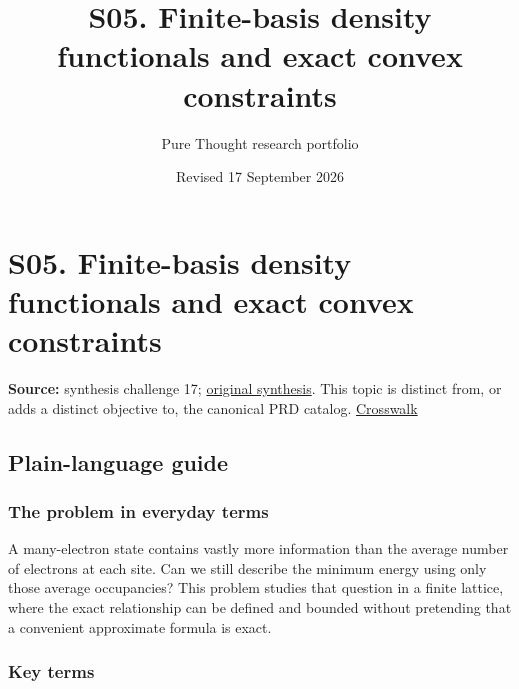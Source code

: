 \documentclass[
  11pt,
]{article}
\title{S05. Finite-basis density functionals and exact convex
constraints}
\author{Pure Thought research portfolio}
\date{Revised 17 September 2026}
\begin{document}
\maketitle
\thispagestyle{empty}
\clearpage

\section{S05. Finite-basis density functionals and exact convex
constraints}

\textbf{Source:} synthesis challenge 17;
\href{https://github.com/rick-stevens-ai/Pure-Thought/blob/main/NOTES/30-Most-Compelling-Pure-Thought-AI-Challenges.md}{original
synthesis}. This topic is distinct from, or adds a distinct objective
to, the canonical PRD catalog.
\href{https://github.com/rick-stevens-ai/Pure-Thought/blob/main/reviews/SYNTHESIS-CROSSWALK.md}{Crosswalk}

\subsection{Plain-language guide}

\subsubsection{The problem in everyday terms}

A many-electron state contains vastly more information than the average
number of electrons at each site. Can we still describe the minimum
energy using only those average occupancies? This problem studies that
question in a finite lattice, where the exact relationship can be
defined and bounded without pretending that a convenient approximate
formula is exact.

\subsubsection{Key terms}
\end{document}
